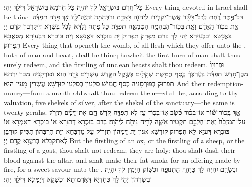 {כׇּל־חֵ֥רֶם בְּיִשְׂרָאֵ֖ל לְךָ֥ יִהְיֶֽה׃}
{כָּל חֶרְמָא בְּיִשְׂרָאֵל דִּילָךְ יְהֵי׃}
{Every thing devoted in Israel shall be thine.}{}
{כׇּל־פֶּ֣טֶר רֶ֠חֶם לְֽכׇל־בָּשָׂ֞ר אֲשֶׁר־יַקְרִ֧יבוּ לַֽיהֹוָ֛ה בָּאָדָ֥ם וּבַבְּהֵמָ֖ה יִֽהְיֶה־לָּ֑ךְ אַ֣ךְ \legarmeh  פָּדֹ֣ה תִפְדֶּ֗ה אֵ֚ת בְּכ֣וֹר הָֽאָדָ֔ם וְאֵ֛ת בְּכֽוֹר־הַבְּהֵמָ֥ה הַטְּמֵאָ֖ה תִּפְדֶּֽה׃}
{כָּל פָּתַח וַלְדָּא לְכָל בִּשְׂרָא דִּיקָרְבוּן קֳדָם יְיָ בַּאֲנָשָׁא וּבִבְעִירָא יְהֵי לָךְ בְּרַם מִפְרָק תִּפְרוּק יָת בּוּכְרָא דַּאֲנָשָׁא וְיָת בּוּכְרָא דִּבְעִירָא מְסָאֲבָא תִּפְרוּק׃}
{Every thing that openeth the womb, of all flesh which they offer unto the \lord, both of man and beast, shall be thine; howbeit the first-born of man shalt thou surely redeem, and the firstling of unclean beasts shalt thou redeem.}{}
{וּפְדוּיָו֙ מִבֶּן־חֹ֣דֶשׁ תִּפְדֶּ֔ה בְּעֶ֨רְכְּךָ֔ כֶּ֛סֶף חֲמֵ֥שֶׁת שְׁקָלִ֖ים בְּשֶׁ֣קֶל הַקֹּ֑דֶשׁ עֶשְׂרִ֥ים גֵּרָ֖ה הֽוּא׃}
{וּפוּרְקָנֵיהּ מִבַּר יַרְחָא תִּפְרוּק בְּפוּרְסָנֵיהּ כְּסַף חֲמֵישׁ סִלְעִין בְּסִלְעֵי קוּדְשָׁא עֶשְׂרִין מָעִין הוּא׃}
{And their redemption-money—from a month old shalt thou redeem them—shall be, according to thy valuation, five shekels of silver, after the shekel of the sanctuary—the same is twenty gerahs.}{}
{אַ֣ךְ בְּֽכוֹר־שׁ֡וֹר אֽוֹ־בְכ֨וֹר כֶּ֜שֶׂב אֽוֹ־בְכ֥וֹר עֵ֛ז לֹ֥א תִפְדֶּ֖ה קֹ֣דֶשׁ הֵ֑ם אֶת־דָּמָ֞ם תִּזְרֹ֤ק עַל־הַמִּזְבֵּ֙חַ֙ וְאֶת־חֶלְבָּ֣ם תַּקְטִ֔יר אִשֶּׁ֛ה לְרֵ֥יחַ נִיחֹ֖חַ לַֽיהֹוָֽה׃}
{בְּרַם בּוּכְרָא דְּתוֹרָא אוֹ בּוּכְרָא דְּאִמְּרָא אוֹ בּוּכְרָא דְּעִזָּא לָא תִפְרוּק קוּדְשָׁא אִנּוּן יָת דַּמְהוֹן תִּזְרוֹק עַל מַדְבְּחָא וְיָת תַּרְבְּהוֹן תַּסֵּיק קוּרְבַּן לְאִתְקַבָּלָא בְּרַעֲוָא קֳדָם יְיָ׃}
{But the firstling of an ox, or the firstling of a sheep, or the firstling of a goat, thou shalt not redeem; they are holy: thou shalt dash their blood against the altar, and shalt make their fat smoke for an offering made by fire, for a sweet savour unto the \lord.}{}
{וּבְשָׂרָ֖ם יִהְיֶה־לָּ֑ךְ כַּחֲזֵ֧ה הַתְּנוּפָ֛ה וּכְשׁ֥וֹק הַיָּמִ֖ין לְךָ֥ יִהְיֶֽה׃
}
{וּבִשְׂרְהוֹן יְהֵי לָךְ כְּחַדְיָא דַּאֲרָמוּתָא וּכְשָׁקָא דְּיַמִּינָא דִּילָךְ יְהֵי׃}
